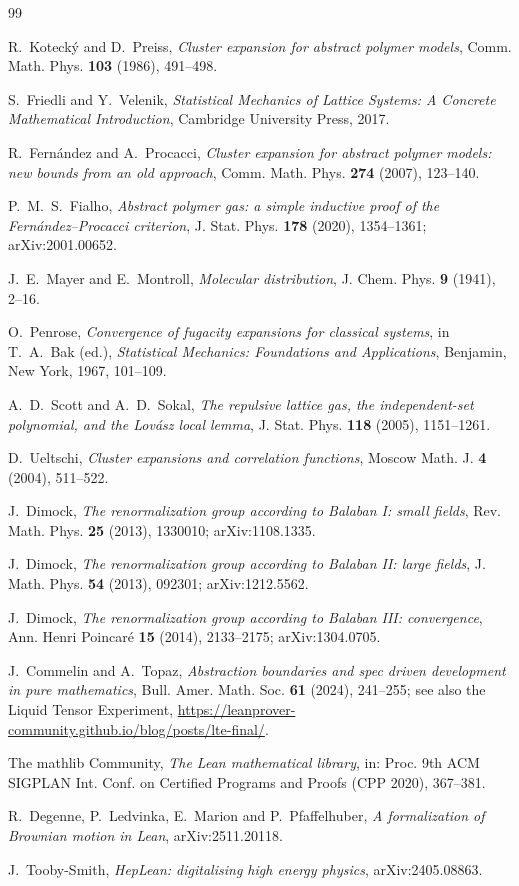\documentclass[11pt]{amsart}
\begin{document}
\begin{thebibliography}{99}

 R.~Kotecký and D.~Preiss, \emph{Cluster expansion for
abstract polymer models}, Comm. Math. Phys. \textbf{103} (1986), 491--498.

 S.~Friedli and Y.~Velenik, \emph{Statistical Mechanics of
Lattice Systems: A Concrete Mathematical Introduction}, Cambridge University
Press, 2017.

 R.~Fernández and A.~Procacci, \emph{Cluster expansion for
abstract polymer models: new bounds from an old approach}, Comm. Math. Phys.
\textbf{274} (2007), 123--140.

 P.~M.~S.~Fialho, \emph{Abstract polymer gas: a simple
inductive proof of the Fernández--Procacci criterion}, J. Stat. Phys.
\textbf{178} (2020), 1354--1361; arXiv:2001.00652.

 J.~E.~Mayer and E.~Montroll, \emph{Molecular
distribution}, J. Chem. Phys. \textbf{9} (1941), 2--16.

 O.~Penrose, \emph{Convergence of fugacity expansions for
classical systems}, in T.~A.~Bak (ed.), \emph{Statistical Mechanics:
Foundations and Applications}, Benjamin, New York, 1967, 101--109.

 A.~D.~Scott and A.~D.~Sokal, \emph{The repulsive lattice
gas, the independent-set polynomial, and the Lovász local lemma}, J. Stat.
Phys. \textbf{118} (2005), 1151--1261.

 D.~Ueltschi, \emph{Cluster expansions and correlation
functions}, Moscow Math. J. \textbf{4} (2004), 511--522.

 J.~Dimock, \emph{The renormalization group according to
Balaban I: small fields}, Rev. Math. Phys. \textbf{25} (2013), 1330010;
arXiv:1108.1335.

 J.~Dimock, \emph{The renormalization group according to
Balaban II: large fields}, J. Math. Phys. \textbf{54} (2013), 092301;
arXiv:1212.5562.

 J.~Dimock, \emph{The renormalization group according to
Balaban III: convergence}, Ann. Henri Poincaré \textbf{15} (2014),
2133--2175; arXiv:1304.0705.

 J.~Commelin and A.~Topaz, \emph{Abstraction boundaries and
spec driven development in pure mathematics}, Bull. Amer. Math. Soc.
\textbf{61} (2024), 241--255; see also the Liquid Tensor Experiment,
\url{https://leanprover-community.github.io/blog/posts/lte-final/}.

 The mathlib Community, \emph{The Lean mathematical
library}, in: Proc. 9th ACM SIGPLAN Int. Conf. on Certified Programs and
Proofs (CPP 2020), 367--381.

 R.~Degenne, P.~Ledvinka, E.~Marion and P.~Pfaffelhuber,
\emph{A formalization of Brownian motion in Lean}, arXiv:2511.20118.

 J.~Tooby-Smith, \emph{HepLean: digitalising high energy
physics}, arXiv:2405.08863.

\end{thebibliography}
\end{document}
